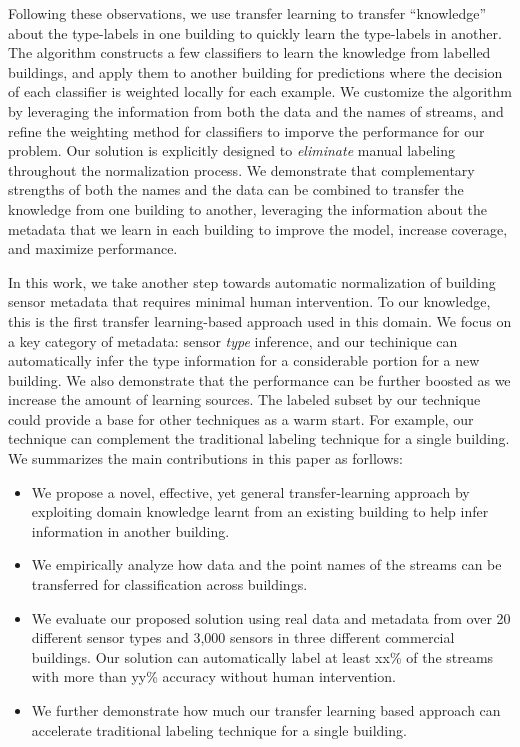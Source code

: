 Following these observations, we use transfer learning to transfer ``knowledge'' about the type-labels in one building to quickly learn the type-labels in another.
The algorithm constructs a few classifiers to learn the knowledge from labelled buildings, and apply them to another building for predictions where the decision of each classifier is weighted locally for each example.
We customize the algorithm by leveraging the information from both the data and the names of streams, and refine the weighting method for classifiers to imporve the performance for our problem.
Our solution is explicitly designed to \emph{eliminate} manual labeling throughout the normalization process.
We demonstrate that complementary strengths of both the names and the data can be combined to 
transfer the knowledge from one building to another, leveraging the information about the metadata that
we learn in each building to improve the model, increase coverage, and maximize performance.

In this work, we take another step towards automatic normalization of building 
sensor metadata that requires minimal human intervention. 
To our knowledge, this is the first transfer learning-based approach used in this domain.  
We focus on a key category of metadata: sensor {\it type} inference, and our techinique can automatically infer the type information for a considerable portion for a new building. We also demonstrate that the performance can be further boosted as we increase the amount of learning sources. 
The labeled subset by our technique could provide a base for other techniques as a warm start. 
For example, our technique can complement the traditional labeling technique for a single building. 
We summarizes the main contributions in this paper as forllows:
\begin{itemize}\itemsep1pt \parskip1pt 
\item We propose a novel, effective, yet general transfer-learning approach by exploiting domain knowledge learnt from an existing building to help infer information in another building.
\item We empirically analyze how data and the point names of the streams can be transferred for classification across buildings.
\item We evaluate our proposed solution using real data and metadata from over 20 different sensor types and 3,000 sensors in three different commercial buildings.  Our solution can automatically label at least xx\% of the streams with more than yy\% accuracy without human intervention.
\item We further demonstrate how much our transfer learning based approach can accelerate traditional labeling technique for a single building.
\end{itemize}
